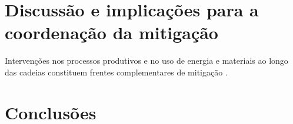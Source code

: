 \documentclass[12pt]{article}
\begin{document}

\section{Discussão e implicações para a coordenação da mitigação}
Intervenções nos processos produtivos e no uso de energia e materiais ao longo das cadeias constituem frentes complementares de mitigação \parencite{rissman2020}.

\section{Conclusões}
\printbibliography[title={Referências}]

\end{document}

